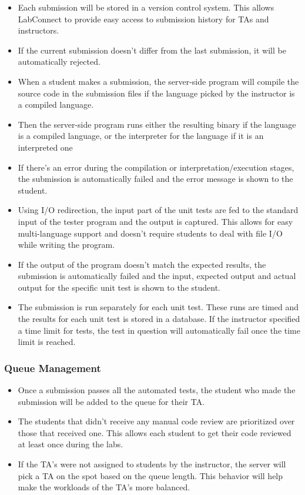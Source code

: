 \documentclass[a4paper, 12pt]{article}
\begin{document}
    \begin{itemize}
      \item Each submission will be stored in a version control system. This allows LabConnect to provide easy access to
      submission history for TAs and instructors.
      \item If the current submission doesn't differ from the last submission, it will be automatically rejected.
      \item When a student makes a submission, the server-side program will compile the source code in the submission
      files if the language picked by the instructor is a compiled language.
      \item Then the server-side program runs either the resulting binary if the language is a compiled language, or the
      interpreter for the language if it is an interpreted one
      \item If there's an error during the compilation or interpretation/execution stages, the submission is automatically failed and
      the error message is shown to the student.
      \item Using I/O redirection, the input part of the unit tests are fed to the standard input of the tester program and the output is captured.
      This allows for easy multi-language support and doesn't require students to deal with file I/O while writing the program.
      \item If the output of the program doesn't match the expected results, the submission is automatically failed and the input, expected
      output and actual output for the specific unit test is shown to the student.
      \item The submission is run separately for each unit test. These runs are timed and the results for each unit test is stored in a database.
      If the instructor specified a time limit for tests, the test in question will automatically fail once the time limit is reached.
    \end{itemize}

    \subsubsection{Queue Management}
    \begin{itemize}
      \item Once a submission passes all the automated tests, the student who made the submission will be added to the queue for their TA.
      \item The students that didn't receive any manual code review are prioritized over those that received one. This allows each student to
      get their code reviewed at least once during the labs.
      \item If the TA's were not assigned to students by the instructor, the server will pick a TA on the spot based on the queue length. This
      behavior will help make the workloads of the TA's more balanced.
    \end{itemize}
\end{document}
